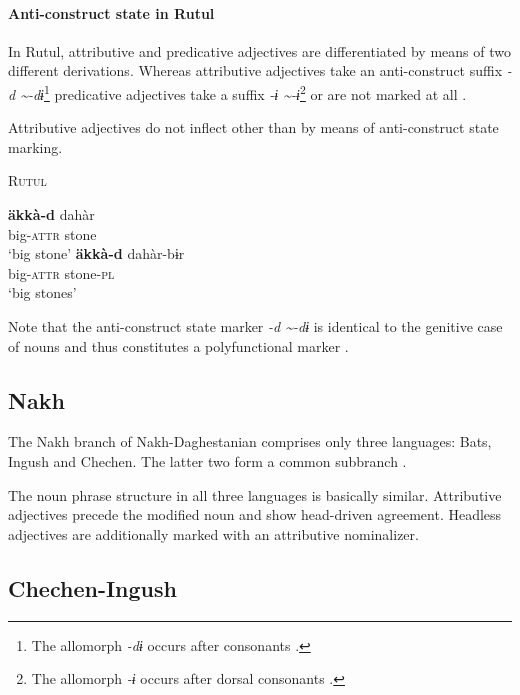 \paragraph{Anti-construct state in Rutul}
In Rutul, attributive and predicative adjectives are differentiated by means of two different derivations. Whereas attributive adjectives take an anti-construct suffix \textit{-d \textasciitilde-dɨ}\footnote{The allomorph \textit{-dɨ} occurs after consonants \citep[224]{alekseev1994a}.} predicative adjectives take a suffix \textit{-ɨ \textasciitilde-ɨ}\footnote{The allomorph \textit{-ɨ} occurs after dorsal consonants \citep[224]{alekseev1994a}.} or are not marked at all \citep[224]{alekseev1994a}.

Attributive adjectives do not inflect other than by means of anti-construct state marking.
\begin{exe}
\ex \textsc{Rutul} \citep[237]{alekseev1994a}
\begin{xlist}
\ex
\gll	\textbf{äkkà-d} dahàr\\
	big-\textsc{attr} stone\\
\glt	‘big stone’
\ex
\gll	\textbf{äkkà-d} dahàr-bɨr\\
	big-\textsc{attr} stone-\textsc{pl}\\
\glt	‘big stones’
\end{xlist}
\end{exe}
Note that the anti-construct state marker \textit{-d \textasciitilde-dɨ} is identical to the genitive case of nouns and thus constitutes a polyfunctional marker \cite{alekseev1994a}.

\subsection{Nakh}
The Nakh branch of Nakh-Daghestanian comprises only three languages: Bats, Ingush and Chechen. The latter two form a common subbranch \citep[220, 233]{salminen2007}.

The noun phrase structure in all three languages is basically similar. Attributive adjectives precede the modified noun and show head-driven agreement. Headless adjectives are additionally marked with an attributive nominalizer.

\subsection{Chechen-Ingush}\label{ingush synchr}
